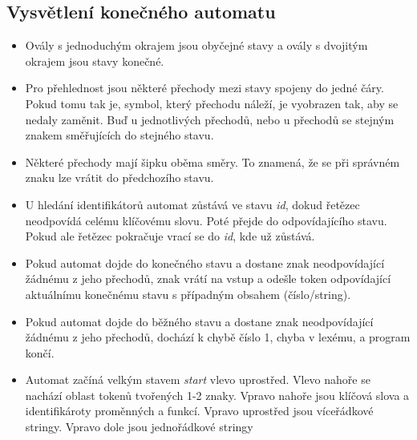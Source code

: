 \documentclass[a4paper, 12pt]{article}
\begin{document}
\subsection{Vysvětlení konečného automatu}
\begin{itemize}
    \item Ovály s jednoduchým okrajem jsou obyčejné stavy a ovály s dvojitým okrajem jsou stavy konečné.
    \item Pro přehlednost jsou některé přechody mezi stavy spojeny do jedné čáry. Pokud tomu tak je, symbol, který přechodu náleží, je vyobrazen tak, aby se nedaly zaměnit. Buď u jednotlivých přechodů, nebo u přechodů se stejným znakem směřujících do stejného stavu. 
    \item Některé přechody mají šipku oběma směry. To znamená, že se při správném znaku lze vrátit do předchozího stavu.
    \item U hledání identifikátorů automat zůstává ve stavu \textit{id}, dokud řetězec neodpovídá celému klíčovému slovu. Poté přejde do odpovídajícího stavu. Pokud ale řetězec pokračuje vrací se do \textit{id}, kde už zůstává.
    \item Pokud automat dojde do konečného stavu a dostane znak neodpovídající žádnému z jeho přechodů, znak vrátí na vstup a odešle token odpovídající aktuálnímu konečnému stavu s případným obsahem (číslo/string).
    \item Pokud automat dojde do běžného stavu a dostane znak neodpovídající žádnému z jeho přechodů, dochází k chybě číslo 1, chyba v lexému, a program končí.
    \item Automat začíná velkým stavem \textit{start} vlevo uprostřed. Vlevo nahoře se nachází oblast tokenů tvořených 1-2 znaky. Vpravo nahoře jsou klíčová slova a identifikároty proměnných a funkcí. Vpravo uprostřed jsou víceřádkové stringy. Vpravo dole jsou jednořádkové stringy
\end{itemize}

\newpage
\end{document}
